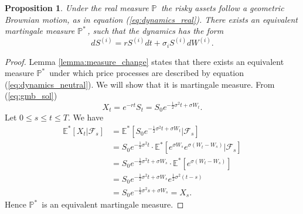 \documentclass[a4paper,11pt, twoside]{book}
\newtheorem{prop}[thm]{Proposition}
\theoremstyle{definition}
\theoremstyle{remark}
\def\P{{\mathbb{P}}\,}
\def\Em{{\mathbb{E}^*}}
\def\Pm{{\mathbb{P}}^*\,}
\begin{document}
\begin{prop}
\label{prop:rn-dynamics}
 Under the real measure $\P$ the risky assets follow a geometric Brownian motion, as in equation (\ref{eq:dynamics_real}). There exists an equivalent martingale measure $\Pm$, such that the dynamics has the form
 \begin{equation}
  \label{eq:dynamics_neutral}
  dS^{(i)} = r S^{(i)} dt + \sigma_i S^{(i)} dW^{(i)}.
 \end{equation}
\end{prop}
\begin{proof}
 Lemma \ref{lemma:measure_change} states that there exists an equivalent measure $\Pm$ under which price processes are described by equation (\ref{eq:dynamics_neutral}). We will show that it is martingale measure.
 From (\ref{eq:gmb_sol})
 \[ X_t = e^{-rt} S_t = S_0 e^{ -\frac{1}{2}\sigma^2 t + \sigma W_t }. \]
 Let $0 \leq s \leq t \leq T$. We have
 \begin{equation*}
  \begin{split}
   \Em[X_t | \mathcal{F}_s] &= \Em[ S_0 e^{ -\frac{1}{2}\sigma^2 t + \sigma W_t } | \mathcal{F}_s] \\
       &= S_0 e^{-\frac{1}{2}\sigma^2 t} \cdot \Em[ e^{  \sigma W_s} e^{ \sigma (W_t - W_s) } | \mathcal{F}_s] \\
       &= S_0 e^{-\frac{1}{2}\sigma^2 t + \sigma W_s} \cdot \Em[ e^{ \sigma (W_t - W_s) }] \\
       &= S_0 e^{-\frac{1}{2}\sigma^2 t + \sigma W_s}  e^{ \frac{1}{2}\sigma^2(t-s) } \\
       &= S_0 e^{-\frac{1}{2}\sigma^2 s + \sigma W_s} = X_s.
  \end{split}
 \end{equation*}
Hence $\Pm$ is an equivalent martingale measure.
\end{proof}
\end{document}
